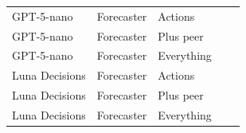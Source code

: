 \begin{tabular}{lllcc}
GPT-5-nano & Forecaster & Actions & \qwenMonNanoForecastActionsEver{} \qwenMonNanoForecastActionsEverCI{} & \qwenMonNanoForecastActionsNear{} \qwenMonNanoForecastActionsNearCI{} \\
GPT-5-nano & Forecaster & Plus peer & \qwenMonNanoForecastPeerEver{} \qwenMonNanoForecastPeerEverCI{} & \qwenMonNanoForecastPeerNear{} \qwenMonNanoForecastPeerNearCI{} \\
GPT-5-nano & Forecaster & Everything & \qwenMonNanoForecastAllEver{} \qwenMonNanoForecastAllEverCI{} & \qwenMonNanoForecastAllNear{} \qwenMonNanoForecastAllNearCI{} \\
Luna Decisions & Forecaster & Actions & \qwenMonLunaForecastActionsEver{} \qwenMonLunaForecastActionsEverCI{} & \qwenMonLunaForecastActionsNear{} \qwenMonLunaForecastActionsNearCI{} \\
Luna Decisions & Forecaster & Plus peer & \qwenMonLunaForecastPeerEver{} \qwenMonLunaForecastPeerEverCI{} & \qwenMonLunaForecastPeerNear{} \qwenMonLunaForecastPeerNearCI{} \\
Luna Decisions & Forecaster & Everything & \qwenMonLunaForecastAllEver{} \qwenMonLunaForecastAllEverCI{} & \qwenMonLunaForecastAllNear{} \qwenMonLunaForecastAllNearCI{} \\
\bottomrule
\end{tabular}
